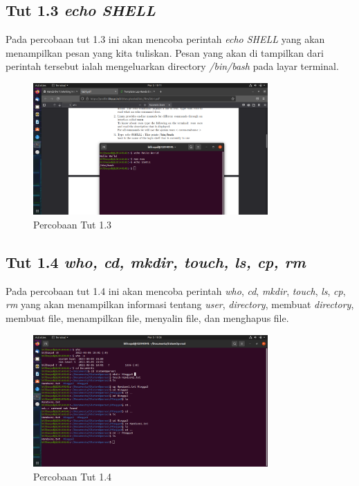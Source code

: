 \documentclass[11pt,a4paper]{article}
\begin{document}
\subsection{Tut 1.3 \textit{echo SHELL}}
	Pada percobaan tut 1.3 ini akan mencoba perintah \textit{echo SHELL} yang akan menampilkan pesan yang kita tuliskan. Pesan yang akan
	di tampilkan dari perintah tersebut ialah mengeluarkan directory \textit{/bin/bash} pada layar terminal.
	\begin{figure}[h]
		\centering
		\includegraphics[width=0.8\textwidth]{Figure/tut 1.3.png}
		\caption{Percobaan Tut 1.3}
	\end{figure}

\subsection{Tut 1.4 \textit{who, cd, mkdir, touch, ls, cp, rm}}
	Pada percobaan tut 1.4 ini akan mencoba perintah \textit{who}, \textit{cd}, \textit{mkdir}, \textit{touch}, \textit{ls}, \textit{cp}, 
	\textit{rm} yang akan menampilkan informasi tentang \textit{user}, \textit{directory}, membuat \textit{directory}, membuat file, menampilkan file, 
	menyalin file, dan menghapus file.
	\begin{figure}[h]
		\centering
		\includegraphics[width=0.8\textwidth]{Figure/tut 1.4.png}
		\caption{Percobaan Tut 1.4}
	\end{figure}
\end{document}
